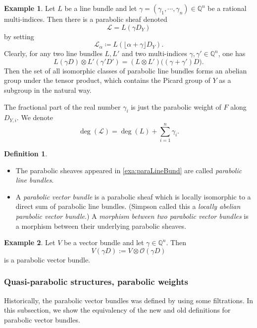 \documentclass[12pt,twoside]{book}
\theoremstyle{plain}
\theoremstyle{definition}
\newtheorem{definition}[definition]{Definition}
\newtheorem{example}[example]{Example}
\theoremstyle{remark}
\newcommand{\bQ}{{\mathbb Q}}
\newcommand{\mL}{{\mathcal L}}
\newcommand{\mO}{{\mathcal O}}
\numberwithin{equation}{section}
\begin{document}
\begin{example}\label{exa:paraLineBund} Let $L$ be a line bundle and let $\gamma=(\gamma_1,\cdots,\gamma_n)\in\bQ^n$ be a rational multi-indices. Then there is a parabolic sheaf denoted
\[\mL=L(\gamma D_Y) \]
by setting
\[\mL_{\alpha} \coloneqq L(\lfloor\alpha+\gamma\rfloor D_Y).\]
Clearly, for any two line bundles $L,L'$ and two multi-indices $\gamma,\gamma'\in\bQ^n$, one has
\[L(\gamma D)\otimes L'(\gamma' D') = (L\otimes L')\Big((\gamma +\gamma') D\Big).\]
Then the set of all isomorphic classes of parabolic line bundles forms an abelian group under the tensor product, which contains the Picard group of $Y$ as a subgroup in the natural way.

The fractional part of the real number $\gamma_i$ is just the parabolic weight of $F$ along $D_{Y,i}$. We denote
\[\deg(\mL) = \deg(L) + \sum_{i=1}^n \gamma_i.\]
\end{example}

\begin{definition}
\begin{itemize}
\item[1).] The parabolic sheaves appeared in \autoref{exa:paraLineBund} are called \emph{parabolic line bundles}.
\item[2).] A \emph{parabolic vector bundle} is a parabolic sheaf which is locally isomorphic to a direct sum of parabolic line bundles. (Simpson called this a \emph{locally abelian parabolic vector bundle}.)
A \emph{morphism between two parabolic vector bundles} is a morphism between their underlying parabolic sheaves.
\end{itemize}

\end{definition}

\begin{example}
Let $V$ be a vector bundle and let $\gamma \in \bQ^n$. Then
\[V(\gamma D):= V\otimes \mO(\gamma D)\]
is a parabolic vector bundle.
\end{example}


\subsubsection{Quasi-parabolic structures, parabolic weights}
Historically, the parabolic vector bundles was defined by using some filtrations. In this subsection, we show the equivalency of the new and old definitions for parabolic vector bundles.
\end{document}
